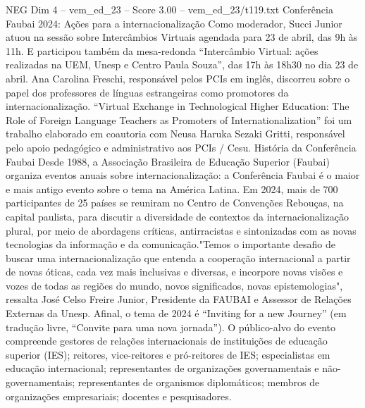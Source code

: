 \begin{textsample}{NEG Dim 4 – vem\_ed\_23 – Score 3.00 – vem\_ed\_23/t119.txt}  \label{ex:f4_neg_091}
Conferência Faubai 2024: Ações para a internacionalização Como moderador, Succi Junior atuou na sessão sobre Intercâmbios Virtuais agendada para 23 de abril, das 9h às 11h.
E participou também da mesa-redonda “Intercâmbio Virtual: ações realizadas na UEM, Unesp e Centro Paula Souza”, das 17h às 18h30 no dia 23 de abril.
Ana Carolina Freschi, responsável pelos PCIs em inglês, discorreu sobre o papel dos professores de línguas estrangeiras como promotores da internacionalização. “Virtual Exchange in Technological Higher Education: The Role of Foreign Language Teachers as Promoters of Internationalization” foi um trabalho elaborado em coautoria com Neusa Haruka Sezaki Gritti, responsável pelo apoio pedagógico e administrativo aos PCIs / Cesu.
História da Conferência Faubai Desde 1988, a Associação Brasileira de Educação Superior (Faubai) organiza eventos anuais sobre internacionalização: a Conferência Faubai é o maior e mais antigo evento sobre o tema na América Latina.
Em 2024, mais de 700 participantes de 25 países se reuniram no Centro de Convenções Rebouças, na capital paulista, para discutir a diversidade de contextos da internacionalização plural, por meio de abordagens críticas, antirracistas e sintonizadas com as novas tecnologias da informação e da comunicação."Temos o importante desafio de buscar uma internacionalização que entenda a cooperação internacional a partir de novas óticas, cada vez mais inclusivas e diversas, e incorpore novas visões e vozes de todas as regiões do mundo, novos significados, novas epistemologias", ressalta José Celso Freire Junior, Presidente da FAUBAI e Assessor de Relações Externas da Unesp.
Afinal, o tema de 2024 é “Inviting for a new Journey” (em tradução livre, “Convite para uma nova jornada”).
O público-alvo do evento compreende gestores de relações internacionais de instituições de educação superior (IES); reitores, vice-reitores e pró-reitores de IES; especialistas em educação internacional; representantes de organizações governamentais e não-governamentais; representantes de organismos diplomáticos; membros de organizações empresariais; docentes e pesquisadores.

\end{textsample}
